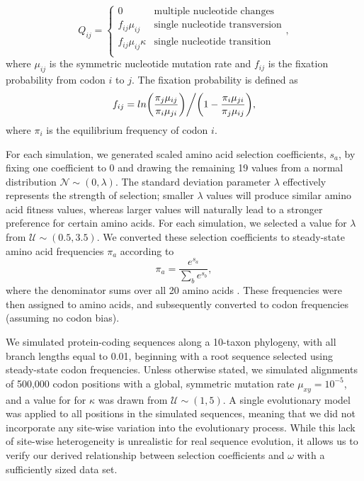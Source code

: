 \documentclass[11pt]{article}
\begin{document}
\begin{equation}
Q_{ij} = \left\{ \begin{array}{rl}
              0                                           &\mbox{multiple nucleotide changes} \\
              f_{ij}\mu_{ij}                          &\mbox{single nucleotide transversion} \\
              f_{ij}\mu_{ij}\kappa               &\mbox{single nucleotide transition} \\
         \end{array} \right.,
\end{equation} where $\mu_{ij}$ is the symmetric nucleotide mutation rate and $f_{ij}$ is the fixation probability from codon $i$ to $j$. The fixation probability is defined as \begin{equation}f_{ij} = ln\bigg{(}\frac{\pi_j\mu_{ij}}{\pi_i\mu_{ji}}\bigg{)}\bigg{/}\bigg{(}1 - \frac{\pi_i\mu_{ji}}{\pi_j\mu_{ij}}\bigg{)},\end{equation} where $\pi_i$ is the equilibrium frequency of codon $i$.

For each simulation, we generated scaled amino acid selection coefficients, $s_a$, by fixing one coefficient to 0 and drawing the remaining 19 values from a normal distribution $\mathcal{N} \sim (0, \lambda)$. The standard deviation parameter $\lambda$ effectively represents the strength of selection; smaller $\lambda$ values will produce similar amino acid fitness values, whereas larger values will naturally lead to a stronger preference for certain amino acids. For each simulation, we selected a value for $\lambda$ from $\mathcal{U} \sim (0.5, 3.5)$.
We converted these selection coefficients to steady-state amino acid frequencies $\pi_a$ according to \begin{equation} \pi_a = \frac{e^{s_a}}{\sum_b e^{s_b}}, \end{equation} where the denominator sums over all 20 amino acids \cite{Ramseyetal2011}. These frequencies were then assigned to amino acids, and subsequently converted to codon frequencies (assuming no codon bias).

We simulated protein-coding sequences along a 10-taxon phylogeny, with all branch lengths equal to 0.01, beginning with a root sequence selected using steady-state codon frequencies. Unless otherwise stated, we simulated alignments of 500,000 codon positions with a global, symmetric mutation rate $\mu_{xy} = 10^{-5}$, and a value for for $\kappa$ was drawn from $\mathcal{U} \sim (1,5)$. A single evolutionary model was applied to all positions in the simulated sequences, meaning that we did not incorporate any site-wise variation into the evolutionary process. While this lack of site-wise heterogeneity is unrealistic for real sequence evolution, it allows us to verify our derived relationship between selection coefficients and $\omega$ with a sufficiently sized data set.
\end{document}
